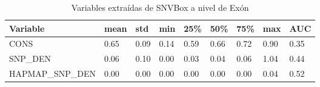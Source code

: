 \begin{table}[H]
\centering
\begin{tabular}{|l|l|l|l|l|l|l|l|l|}
\hline
Variable         & mean & std  & min  & 25\% & 50\% & 75\% & max & AUC  \\ \hline
CONS             & 0.65 & 0.09 & 0.14 & 0.59 & 0.66 & 0.72 & 0.90 & 0.35 \\ \hline
SNP\_DEN         & 0.06 & 0.10 & 0.00 & 0.03 & 0.04 & 0.06 & 1.04 & 0.44 \\ \hline
HAPMAP\_SNP\_DEN & 0.00 & 0.00 & 0.00 & 0.00 & 0.00 & 0.00 & 0.04 & 0.52 \\ \hline
\end{tabular}
\caption{Variables extraídas de SNVBox a nivel de Exón}
\label{snvbox_vars}
\end{table}



